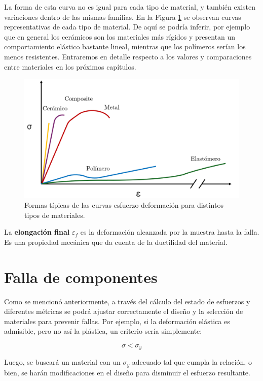 La forma de esta curva no es igual para cada tipo de material, y también existen variaciones dentro de las mismas familias. En la Figura \ref{fig:3} se observan curvas representativas de cada tipo de material. De aquí se podría inferir, por ejemplo que en general los cerámicos son los materiales más rígidos y presentan un comportamiento elástico bastante lineal, mientras que los polímeros serían los menos resistentes. Entraremos en detalle respecto a los valores y comparaciones entre materiales en los próximos capítulos.

\begin{figure}[h!]
    \centering
    \includegraphics[width=0.85\linewidth]{imgs/tract.png}
    \caption{Formas típicas de las curvas esfuerzo-deformación para distintos tipos de materiales.}
    \label{fig:3}
\end{figure}

La \textbf{elongación final} $\varepsilon_{f}$ es la deformación alcanzada por la muestra hasta la falla. Es una propiedad mecánica que da cuenta de la ductilidad del material.

\section{Falla de componentes}

Como se mencionó anteriormente, a través del cálculo del estado de esfuerzos y diferentes métricas se podrá ajustar correctamente el diseño y la selección de materiales para prevenir fallas. Por ejemplo, si la deformación elástica es admisible, pero no así la plástica, un criterio sería simplemente:

\begin{equation}
    \sigma < \sigma_{y}
\end{equation}

Luego, se buscará un material con un $\sigma_{y}$ adecuado tal que cumpla la relación, o bien, se harán modificaciones en el diseño para disminuir el esfuerzo resultante. 

